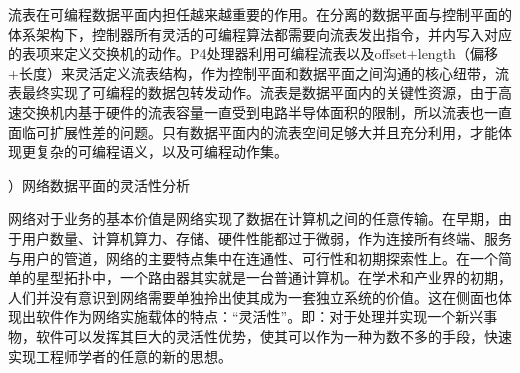 
流表在可编程数据平面内担任越来越重要的作用。在分离的数据平面与控制平面的体系架构下，控制器所有灵活的可编程算法都需要向流表发出指令，并内写入对应的表项来定义交换机的动作。P4处理器利用可编程流表以及offset+length（偏移+长度）来灵活定义流表结构，作为控制平面和数据平面之间沟通的核心纽带，流表最终实现了可编程的数据包转发动作。流表是数据平面内的关键性资源，由于高速交换机内基于硬件的流表容量一直受到电路半导体面积的限制，所以流表也一直面临可扩展性差的问题。只有数据平面内的流表空间足够大并且充分利用，才能体现更复杂的可编程语义，以及可编程动作集。



\label{chap122}

{）网络数据平面的灵活性分析}


网络对于业务的基本价值是网络实现了数据在计算机之间的任意传输。在早期，由于用户数量、计算机算力、存储、硬件性能都过于微弱，作为连接所有终端、服务与用户的管道，网络的主要特点集中在连通性、可行性和初期探索性上。在一个简单的星型拓扑中，一个路由器其实就是一台普通计算机。在学术和产业界的初期，人们并没有意识到网络需要单独拎出使其成为一套独立系统的价值。这在侧面也体现出软件作为网络实施载体的特点：“灵活性”。即：对于处理并实现一个新兴事物，软件可以发挥其巨大的灵活性优势，使其可以作为一种为数不多的手段，快速实现工程师学者的任意的新的思想。

